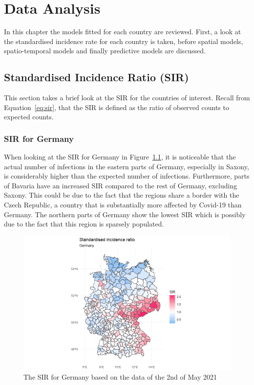 %
\chapter{Data Analysis}
\label{sec:analysis}
In this chapter the models fitted for each country are reviewed. First, a look at the standardised incidence rate for each country is taken, before spatial models, spatio-temporal models and finally predictive models are discussed.
\section{Standardised Incidence Ratio (SIR)}
This section takes a brief look at the SIR for the countries of interest. Recall from Equation~\ref{eq:sir}, that the SIR is defined as the ratio of observed counts to expected counts.
\subsection{SIR for Germany}
When looking at the SIR for Germany in Figure~\ref{sirgermany}, it is noticeable that the actual number of infections in the eastern parts of Germany, especially in Saxony, is considerably higher than the expected number of infections. Furthermore, parts of Bavaria have an increased SIR compared to the rest of Germany, excluding Saxony. This could be due to the fact that the regions share a border with the Czech Republic, a country that is substantially more affected by Covid-19 than Germany. The northern parts of Germany show the lowest SIR which is possibly due to the fact that this region is sparsely populated.
\begin{figure}[H]
 \centering
 \includegraphics[width = 1.2\textwidth]{sir_germany.png}
 \caption{The SIR for Germany based on the data of the 2nd of May 2021}
 \label{sirgermany}
\end{figure}
